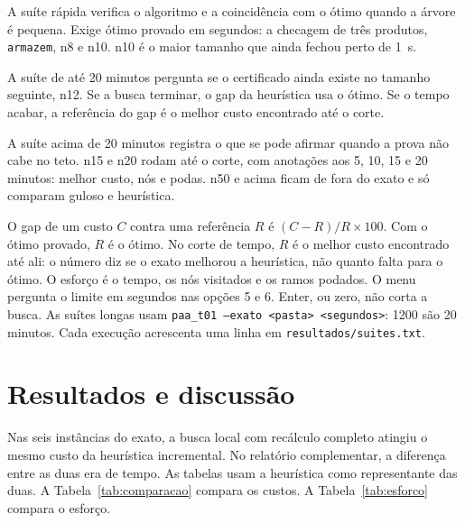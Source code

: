 \documentclass[conference,a4paper]{IEEEtran}
\begin{document}
A suíte rápida verifica o algoritmo e a coincidência com o ótimo quando a árvore é pequena.
Exige ótimo provado em segundos: a checagem de três produtos, \texttt{armazem}, n8 e n10.
n10 é o maior tamanho que ainda fechou perto de 1~s.

A suíte de até 20 minutos pergunta se o certificado ainda existe no tamanho seguinte, n12.
Se a busca terminar, o gap da heurística usa o ótimo.
Se o tempo acabar, a referência do gap é o melhor custo encontrado até o corte.

A suíte acima de 20 minutos registra o que se pode afirmar quando a prova não cabe no teto.
n15 e n20 rodam até o corte, com anotações aos 5, 10, 15 e 20 minutos: melhor custo, nós e podas.
n50 e acima ficam de fora do exato e só comparam guloso e heurística.

O gap de um custo \(C\) contra uma referência \(R\) é \((C - R)/R \times 100\).
Com o ótimo provado, \(R\) é o ótimo.
No corte de tempo, \(R\) é o melhor custo encontrado até ali: o número diz se o exato melhorou a heurística, não quanto falta para o ótimo.
O esforço é o tempo, os nós visitados e os ramos podados.
O menu pergunta o limite em segundos nas opções 5 e 6. Enter, ou zero, não corta a busca.
As suítes longas usam \texttt{paa\_t01 --exato <pasta> <segundos>}: 1200 são 20 minutos. Cada execução acrescenta uma linha em \texttt{resultados/suites.txt}.

\section{Resultados e discussão}
Nas seis instâncias do exato, a busca local com recálculo completo atingiu o mesmo custo da heurística incremental.
No relatório complementar, a diferença entre as duas era de tempo.
As tabelas usam a heurística como representante das duas.
A Tabela~\ref{tab:comparacao} compara os custos.
A Tabela~\ref{tab:esforco} compara o esforço.

\begin{table}[H]
\caption{Custo do guloso, da heurística e do exato.
n\(k\) é a instância com \(k\) produtos.
Em n15 e n20 a coluna Exato é o melhor custo encontrado no corte, não o ótimo.
O asterisco marca gap contra esse custo, sem certificado.}
\label{tab:comparacao}
\centering
{}
\end{table}
\end{document}

